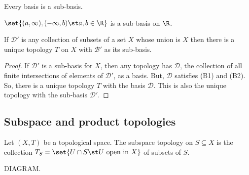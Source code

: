 \begin{nprop}
  Every basis is a sub-basis.
\end{nprop}

\begin{negg}
  $\set{(a,\infty), (-\infty,b) \st a,b \in \R}$ is a sub-basis on $\R$.
\end{negg}

\begin{nprop}
  If $\mathcal{D}'$ is any collection of subsets of a set $X$ whose union is $X$ then there is a unique topology $T$ on $X$ with $\mathcal{B}'$ as its sub-basis.
\end{nprop}
\begin{proof}
  If $\mathcal{D}'$ is a sub-basis for $X$, then any topology has $\mathcal{D}$, the collection of all finite intersections of elements of $\mathcal{D}'$, as a basis. But, $\mathcal{D}$ satisfies (B1) and (B2). So, there is a unique topology $T$ with the basis $\mathcal{D}$. This is also the unique topology with the sub-basis $\mathcal{D}'$.
\end{proof}

\subsection{Subspace and product topologies}
\begin{ndfn}
  Let $(X,T)$ be a topological space. The subspace topology on $S \subseteq X$ is the collection $T_S = \set{U \cap S \st U \text{ open in } X}$ of subsets of $S$.
\end{ndfn}

DIAGRAM.

